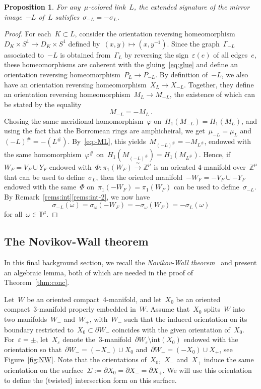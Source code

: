 \documentclass{amsart}
\newcommand{\Z}{\mathbb{Z}}
\newcommand{\T}{\mathbb{T}}
\newtheorem{prop}[thm]{Proposition}
\theoremstyle{definition}
\theoremstyle{remark}
\begin{document}
	\begin{prop}
	\label{prop:sign-L}
For any~$\mu$-colored link~$L$, the extended signature of  the mirror image~$-L$ of~$L$ satisfies~$\sigma_{-L}=-\sigma_L$.
	\end{prop}
	\begin{proof}
	For each~$K\subset L$, consider the orientation reversing homeomorphism~$D_K\times S^1\to D_K\times S^1$ defined by~$(x,y)\mapsto (x,y^{-1})$. Since the graph~$\Gamma_{-L}$ associated to~$-L$ is obtained from~$\Gamma_L$ by reversing the sign~$\varepsilon(e)$ of all edges~$e$, these homeomorphisms are coherent 
	with the gluing~\eqref{eq:glue} and define an orientation reversing homeomorphism~$P_L\to P_{-L}$.
By definition of~$-L$, we also have an orientation reversing homeomorphism~$X_L\to X_{-L}$.
Together, they define an orientation reversing homeomorphism~$M_L\to M_{-L}$, the existence of which can be stated by the equality
\begin{equation}
\label{eq:-ML}
M_{-L}=-M_L\,.
\end{equation}
Chosing the same meridional homomorphism~$\varphi$ on~$H_1(M_{-L})=H_1(M_L)$, and using the fact that the Borromean rings are amphicheiral, we get~$\mu_{-L}=\mu_L$ and~$(-L)^\#=-(L^\#)$. By~\eqref{eq:-ML}, this yields~$M_{(-L)^\#}=-M_{L^\#}$, endowed with the same homomorphism~$\varphi^\#$ on~$H_1(M_{(-L)^\#})=H_1(M_{L^\#})$.
Hence, if~$W_F=V_F\cup Y_F$ endowed with~$\Phi\colon\pi_1(W_F)\stackrel{\simeq}{\to}\Z^\mu$ is an oriented $4$-manifold over~$\Z^\mu$ that can be used to define~$\sigma_L$, then the oriented manifold~$-W_F=-V_F\cup -Y_F$ endowed with the same~$\Phi$ on~$\pi_1(-W_F)=\pi_1(W_F)$ can be used to define~$\sigma_{-L}$. By Remark~\ref{rems:int}\ref{rems:int-2}, we now have
\[
\sigma_{-L}(\omega)=\sigma_\omega(-W_F)=-\sigma_\omega(W_F)=-\sigma_L(\omega)
\]
for all~$\omega\in\T^\mu$.
	\end{proof}
	
	\subsection{The Novikov-Wall theorem}
	\label{sub:NW}
	
	In this final background section, we recall the {\em Novikov-Wall theorem\/}~\cite{Wal} and present an algebraic lemma, both of which are needed in the proof of Theorem~\ref{thm:conc}.
	
	\medskip
	
	Let~$W$ be an oriented compact~4-manifold,
	and let~$X_0$ be an oriented compact~3-manifold properly embedded in~$W$. Assume that~$X_0$ splits~$W$ into two manifolds~$W_-$
	and~$W_+$, with~$W_-$ such that the induced orientation on its boundary restricted to~$X_0\subset\partial W_-$
	coincides with the given orientation of~$X_0$.
	For~$\varepsilon=\pm$, let~$X_\varepsilon$ denote the~3-manifold~$\partial W_\varepsilon\setminus\mathrm{int}(X_0)$ endowed with the orientation so that~$\partial W_-=(-X_-)\cup X_0$ and~$\partial W_+=(-X_0)\cup X_+$, see Figure~\ref{fig:NW}. Note that the orientations of~$X_0$,~$X_-$ and~$X_+$ induce the same orientation on the
	surface~$\Sigma:=\partial X_0=\partial X_-=\partial X_+$. We will use this orientation to define the (twisted) intersection form on this surface.
	
\end{document}
